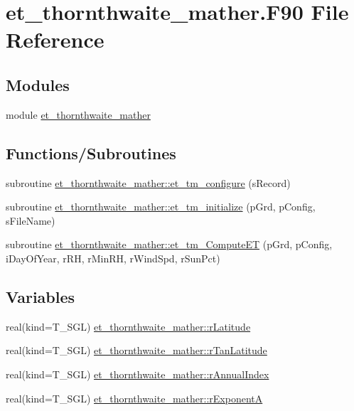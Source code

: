 \hypertarget{et__thornthwaite__mather_8_f90}{
\section{et\_\-thornthwaite\_\-mather.F90 File Reference}
\label{et__thornthwaite__mather_8_f90}
}
\subsection*{Modules}
\begin{DoxyCompactItemize}
\item 
module \hyperlink{namespaceet__thornthwaite__mather}{et\_\-thornthwaite\_\-mather}
\end{DoxyCompactItemize}
\subsection*{Functions/Subroutines}
\begin{DoxyCompactItemize}
\item 
subroutine \hyperlink{namespaceet__thornthwaite__mather_a84694295e6a4da72980bb30f1adc6a82}{et\_\-thornthwaite\_\-mather::et\_\-tm\_\-configure} (sRecord)
\item 
subroutine \hyperlink{namespaceet__thornthwaite__mather_ad8d9ce7fc2d1f78f064d52577e1ff7a8}{et\_\-thornthwaite\_\-mather::et\_\-tm\_\-initialize} (pGrd, pConfig, sFileName)
\item 
subroutine \hyperlink{namespaceet__thornthwaite__mather_a66d5f8c191c0aa82a1ce55b862972afc}{et\_\-thornthwaite\_\-mather::et\_\-tm\_\-ComputeET} (pGrd, pConfig, iDayOfYear, rRH, rMinRH, rWindSpd, rSunPct)
\end{DoxyCompactItemize}
\subsection*{Variables}
\begin{DoxyCompactItemize}
\item 
real(kind=T\_\-SGL) \hyperlink{namespaceet__thornthwaite__mather_a851c5df67086bf9ccad5d274fe8118c2}{et\_\-thornthwaite\_\-mather::rLatitude}
\item 
real(kind=T\_\-SGL) \hyperlink{namespaceet__thornthwaite__mather_a668487e9bfd1609275ea1ede77d25206}{et\_\-thornthwaite\_\-mather::rTanLatitude}
\item 
real(kind=T\_\-SGL) \hyperlink{namespaceet__thornthwaite__mather_aafcf8b496955f8fa02d8fcf420b60302}{et\_\-thornthwaite\_\-mather::rAnnualIndex}
\item 
real(kind=T\_\-SGL) \hyperlink{namespaceet__thornthwaite__mather_a9dd015bf8736b5aca8e3e0c29b39335a}{et\_\-thornthwaite\_\-mather::rExponentA}
\end{DoxyCompactItemize}
